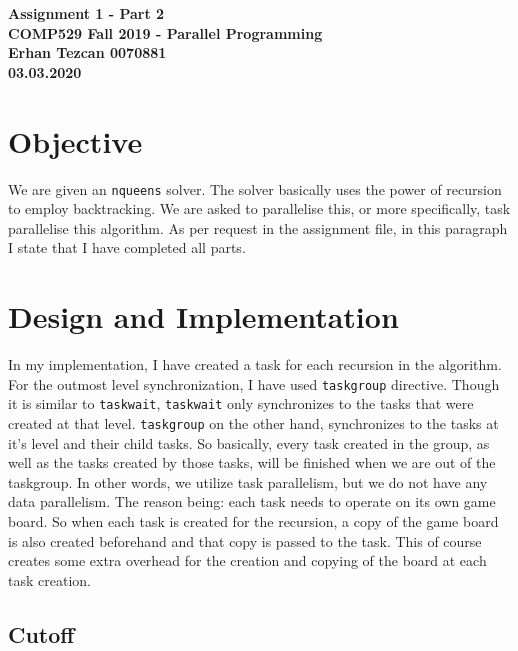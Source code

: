 \documentclass[11pt,reqno]{amsart}
\newcommand{\code}[1]{\texttt{#1}}
\begin{document}
\begin{center}
\large\textbf{Assignment 1 - Part 2 \\ COMP529 Fall 2019 - Parallel Programming} \\
\normalsize\textbf{Erhan Tezcan 0070881 \\ 03.03.2020} \\
\end{center}

\section{Objective}

We are given an \code{nqueens} solver. The solver basically uses the power of recursion to employ backtracking. We are asked to parallelise this, or more specifically, task parallelise this algorithm. As per request in the assignment file, in this paragraph I state that I have completed all parts.

\section{Design and Implementation}

In my implementation, I have created a task for each recursion in the algorithm. For the outmost level synchronization, I have used \code{taskgroup} directive. Though it is similar to \code{taskwait}, \code{taskwait} only synchronizes to the tasks that were created at that level. \code{taskgroup} on the other hand, synchronizes to the tasks at it's level and their child tasks. So basically, every task created in the group, as well as the tasks created by those tasks, will be finished when we are out of the taskgroup. In other words, we utilize task parallelism, but we do not have any data parallelism. The reason being: each task needs to operate on its own game board. So when each task is created for the recursion, a copy of the game board is also created beforehand and that copy is passed to the task. This of course creates some extra overhead for the creation and copying of the board at each task creation. 

\subsection{Cutoff}
\end{document}
